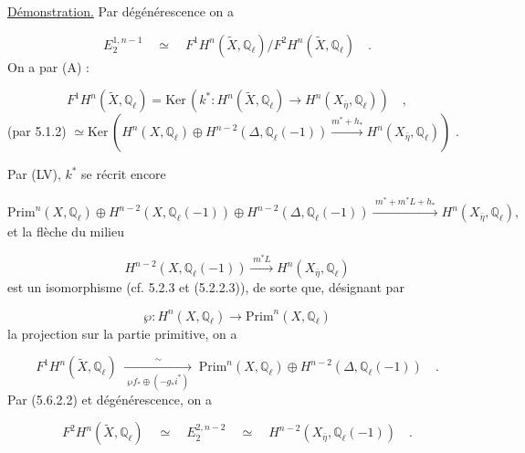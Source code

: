 \underline{Démonstration.} Par dégénérescence on a

\begin{equation*}
E_2^{1,n-1} \quad \simeq \quad F^1 H^n(\tilde{X},\mathbb{Q}_\ell) \Big/ F^2 H^n(\tilde{X},\mathbb{Q}_\ell) \quad .
\end{equation*}
On a par (A) :

\begin{equation}\tag{5.7.2}
F^1 H^n(\tilde{X},\mathbb{Q}_\ell) = \mathrm{Ker}\,(k^* : H^n(\tilde{X},\mathbb{Q}_\ell) \longrightarrow H^n(X_{\bar{\eta}},\mathbb{Q}_\ell)) \quad ,
\end{equation}
(par 5.1.2) $\simeq \mathrm{Ker}\,(H^n(X,\mathbb{Q}_\ell) \oplus H^{n-2}(\Delta,\mathbb{Q}_\ell(-1)) \xrightarrow{m^*+h_*} H^n(X_{\bar{\eta}},\mathbb{Q}_\ell))$ .

Par (LV), $k^*$ se récrit encore

\begin{equation}\tag{5.7.3}
\mathrm{Prim}^n(X,\mathbb{Q}_\ell) \oplus H^{n-2}(X,\mathbb{Q}_\ell(-1)) \oplus H^{n-2}(\Delta,\mathbb{Q}_\ell(-1)) \xrightarrow{\;m^*+m^*L+h_*\;} H^n(X_{\bar{\eta}},\mathbb{Q}_\ell),
\end{equation}
et la flèche du milieu

\begin{equation}\tag{5.7.4}
H^{n-2}(X,\mathbb{Q}_\ell(-1)) \xrightarrow{\;m^*L\;} H^n(X_{\bar{\eta}},\mathbb{Q}_\ell)
\end{equation}
est un isomorphisme (cf. 5.2.3 et (5.2.2.3)), de sorte que, désignant par

\begin{equation}\tag{5.7.5}
\wp : H^n(X,\mathbb{Q}_\ell) \longrightarrow \mathrm{Prim}^n(X,\mathbb{Q}_\ell)
\end{equation}
la projection sur la partie primitive, on a

\begin{equation}\tag{5.7.6}
F^1 H^n(\tilde{X},\mathbb{Q}_\ell) \;\xrightarrow[\;\wp f_*\oplus(-g_*i^*)\;]{\sim}\; \mathrm{Prim}^n(X,\mathbb{Q}_\ell) \oplus H^{n-2}(\Delta,\mathbb{Q}_\ell(-1)) \quad .
\end{equation}
Par (5.6.2.2) et dégénérescence, on a

\begin{equation}\tag{5.7.7}
F^2 H^n(\tilde{X},\mathbb{Q}_\ell) \quad \simeq \quad E_2^{2,n-2} \quad \simeq \quad H^{n-2}(X_{\bar{\eta}},\mathbb{Q}_\ell(-1)) \quad .
\end{equation}


